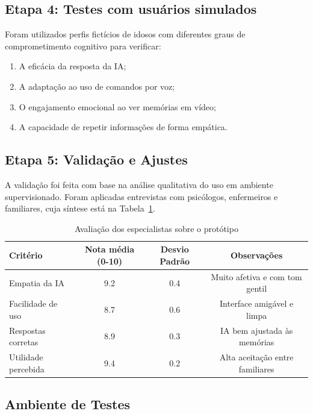 \subsection{Etapa 4: Testes com usuários simulados}

Foram utilizados perfis fictícios de idosos com diferentes graus de comprometimento cognitivo para verificar:

\begin{enumerate}
    \item A eficácia da resposta da IA;
    \item A adaptação ao uso de comandos por voz;
    \item O engajamento emocional ao ver memórias em vídeo;
    \item A capacidade de repetir informações de forma empática.
\end{enumerate}

\subsection{Etapa 5: Validação e Ajustes}

A validação foi feita com base na análise qualitativa do uso em ambiente supervisionado. Foram aplicadas entrevistas com psicólogos, enfermeiros e familiares, cuja síntese está na Tabela~\ref{tab:feedback}.

\begin{table}[h]
\centering
\caption{Avaliação dos especialistas sobre o protótipo}
\label{tab:feedback}
\begin{tabular}{|l|c|c|c|}
\hline
\textbf{Critério} & \textbf{Nota média (0-10)} & \textbf{Desvio Padrão} & \textbf{Observações} \\ \hline
Empatia da IA & 9.2 & 0.4 & Muito afetiva e com tom gentil \\ \hline
Facilidade de uso & 8.7 & 0.6 & Interface amigável e limpa \\ \hline
Respostas corretas & 8.9 & 0.3 & IA bem ajustada às memórias \\ \hline
Utilidade percebida & 9.4 & 0.2 & Alta aceitação entre familiares \\ \hline
\end{tabular}
\end{table}

\subsection{Ambiente de Testes}

